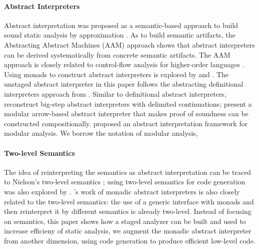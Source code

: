 \paragraph{Abstract Interpreters} Abstract interpretation was proposed as a
semantic-based approach to build sound static analysis by approximation
\cite{DBLP:conf/popl/CousotC77}. As to build semantic artifacts, the Abstracting
Abstract Machines (AAM) \cite{DBLP:journals/jfp/HornM12, DBLP:conf/icfp/HornM10}
approach shows that abstract interpreters can be derived systematically from concrete
semantic artifacts. The AAM approach is closely related to control-flow analysis
for higher-order languages \cite{Midtgaard:2012:CAF:2187671.2187672}.
Using monads to construct abstract interpreters is explored by
\citet{Sergey:2013:MAI:2491956.2491979} and
\citet{DBLP:journals/pacmpl/DaraisLNH17, Darais:2015:GTM:2814270.2814308}.
The unstaged abstract interpreter in this paper follows the abstracting definitional
interpreters approach from \citet{DBLP:journals/pacmpl/DaraisLNH17}.
Similar to definitional abstract interpreters, \citet{Wei:2018:RAA:3243631.3236800}
reconstruct big-step abstract interpreters with delimited continuations;
\citet{Keidel:2018:CSP:3243631.3236767} present a modular arrow-based abstract
interpreter that makes proof of soundness can be constructed compositionally.
\citet{DBLP:conf/cc/CousotC02} proposed an abstract interpretation framework for
modular analysis. We borrow the notation of modular analysis, 

\paragraph{Two-level Semantics} The idea of reinterpreting the semantics as
abstract interpretation can be traced to Nielson's two-level semantics
\cite{NIELSON1989117}; using two-level semantics for code generation was also
explored by \citet{NIELSON198859}. \citet{Sergey:2013:MAI:2491956.2491979}'s
work of monadic abstract interpreters is also closely related to the two-level
semantics: the use of a generic interface with monads and then reinterpret it by
different semantics is already two-level. Instead of focusing on semantics, this
paper shows how a staged analyzer can be built and used to increase efficieny of
static analysis, we augment the monadic abstract interpreter from another
dimension, using code generation to produce efficient low-level code.


